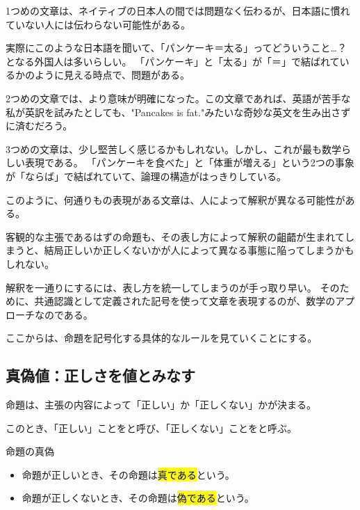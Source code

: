 \documentclass[../../imaging-math]{subfiles}
\begin{document}
1つめの文章は、ネイティブの日本人の間では問題なく伝わるが、日本語に慣れていない人には伝わらない可能性がある。

実際にこのような日本語を聞いて、「パンケーキ＝太る」ってどういうこと…？となる外国人は多いらしい。
「パンケーキ」と「太る」が「＝」で結ばれているかのように見える時点で、問題がある。

\br

2つめの文章では、より意味が明確になった。この文章であれば、英語が苦手な私が英訳を試みたとしても、"Pancakes is fat."みたいな奇妙な英文を生み出さずに済むだろう。

\br

3つめの文章は、少し堅苦しく感じるかもしれない。しかし、これが最も数学らしい表現である。
「パンケーキを食べた」と「体重が増える」という2つの事象が「ならば」で結ばれていて、論理の構造がはっきりしている。

\froufrou

このように、何通りもの表現がある文章は、人によって解釈が異なる可能性がある。

客観的な主張であるはずの命題も、その表し方によって解釈の齟齬が生まれてしまうと、結局正しいか正しくないかが人によって異なる事態に陥ってしまうかもしれない。

\br

解釈を一通りにするには、表し方を統一してしまうのが手っ取り早い。
そのために、共通認識として定義された記号を使って文章を表現するのが、数学のアプローチなのである。

\br

ここからは、命題を記号化する具体的なルールを見ていくことにする。

\subsection{真偽値：正しさを値とみなす}

命題は、主張の内容によって「正しい」か「正しくない」かが決まる。

このとき、「正しい」ことをと呼び、「正しくない」ことをと呼ぶ。

\begin{definition}{命題の真偽}
  \begin{itemize}
    \item 命題が正しいとき、その命題は\hl{真である}という。
    \item 命題が正しくないとき、その命題は\hl{偽である}という。
  \end{itemize}
\end{definition}
\end{document}

